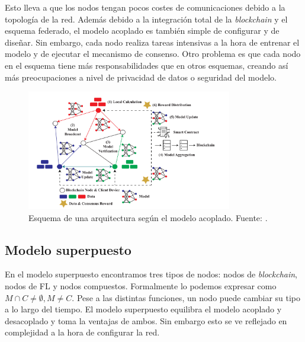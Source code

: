 Esto lleva a que los nodos tengan pocos costes de comunicaciones debido a la topología de la red. Además debido a la integración total de la \textit{blockchain} y el esquema federado, el modelo acoplado es también simple de configurar y de diseñar. Sin embargo, cada nodo realiza tareas intensivas a la hora de entrenar el modelo y de ejecutar el mecanismo de consenso. Otro problema es que cada nodo en el esquema tiene más responsabilidades que en otros esquemas, creando así más preocupaciones a nivel de privacidad de datos o seguridad del modelo.
\begin{figure}[h]
	\centering
	\includegraphics[width=0.8\textwidth]{figuras/coupled.png}
	\caption{Esquema de una arquitectura según el modelo acoplado. Fuente: \cite{zhu-2023-blockfed}.}
	\label{fig:coupled}
\end{figure}

\subsection{Modelo superpuesto}
En el modelo superpuesto encontramos tres tipos de nodos: nodos de \textit{blockchain}, nodos de \ac{FL} y nodos compuestos. Formalmente lo podemos expresar como $M \cap C \ne \emptyset, M\ne C$. Pese a las distintas funciones, un nodo puede cambiar su tipo a lo largo del tiempo. El modelo superpuesto equilibra el modelo acoplado y desacoplado y toma la ventajas de ambos. Sin embargo esto se ve reflejado en complejidad a la hora de configurar la red. 

